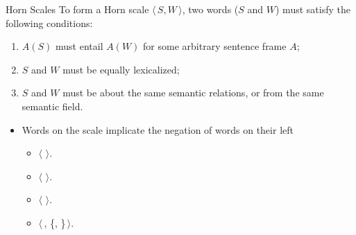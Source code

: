 \documentclass{beamer}
\newcommand{\horn}[1]{\ensuremath{\langle}\,#1\,\ensuremath{\rangle}}
\newcommand{\set}[1]{\{#1\}}
\begin{document}
\begin{frame}{Horn Scales}
 To form a
Horn scale \horn{$S,W$}, two words ($S$ and $W$) must satisfy the following
conditions:
\begin{enumerate}
\item[(i)] $A(S)$ must entail $A(W)$ for some arbitrary sentence frame $A$;
\item[(ii)] $S$ and $W$ must be equally lexicalized;
\item[(iii)] $S$ and $W$ must be about the same semantic relations, or
  from the same semantic field. 
\end{enumerate}
  \begin{itemize}
\item Words on the scale implicate the negation of words on their left
  \begin{itemize}
  \item \horn{}.
  \item \horn{}.
  \item \horn{}.
  \item \horn{,  \set{, }}.
  \end{itemize}
\end{itemize}

 \end{frame}




\end{document}
